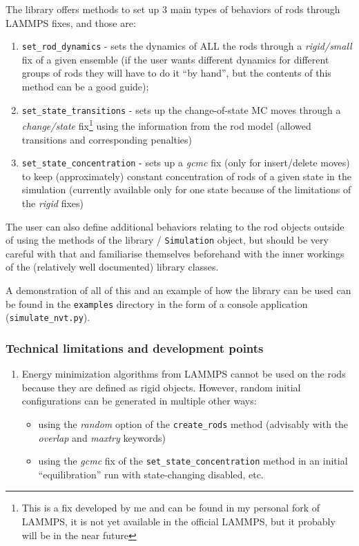 \documentclass[a4paper]{article}
\begin{document}
The library offers methods to set up 3 main types of behaviors of rods through LAMMPS fixes, and those
are:
\begin{enumerate}
	\item \texttt{set\_rod\_dynamics} - sets the dynamics of ALL the rods through a \emph{rigid/small} fix
	of a given ensemble (if the user wants different dynamics for different groups of rods they will have to
	do it ``by hand'', but the contents of this method can be a good guide);
	
	\item \texttt{set\_state\_transitions} - sets up the change-of-state MC moves through a
	\emph{change/state} fix\footnote{This is a fix developed by me and can be found in my personal fork of
	LAMMPS, it is not yet available in the official LAMMPS, but it probably will be in the near future}
	using the information from the rod model (allowed transitions and corresponding penalties) 
	
	\item \texttt{set\_state\_concentration} - sets up a \emph{gcmc} fix (only for insert/delete moves) to
	keep (approximately) constant concentration of rods of a given state in the simulation (currently
	available only for one state because of the limitations of the \emph{rigid} fixes)
\end{enumerate}

The user can also define additional behaviors relating to the rod objects outside of using
the methods of the library / \texttt{Simulation} object, but should be very careful with that and
familiarise themselves beforehand with the inner workings of the (relatively well documented) library
classes.

\vspace{1em}

A demonstration of all of this and an example of how the library can be used can be found in the
\texttt{examples} directory in the form of a console application (\texttt{simulate\_nvt.py}).

\subsubsection*{Technical limitations and development points}

\begin{enumerate}
	\item Energy minimization algorithms from LAMMPS cannot be used on the rods because they are defined as
	rigid objects. However, random initial configurations can be generated in multiple other ways:
	\begin{itemize}
		\item using the \emph{random} option of the \texttt{create\_rods} method (advisably with the
		\emph{overlap} and \emph{maxtry} keywords)
		
		\item using the \emph{gcmc} fix of the \texttt{set\_state\_concentration} method in an initial
		``equilibration'' run with state-changing disabled, etc.
	\end{itemize}
\end{enumerate}
\end{document}
